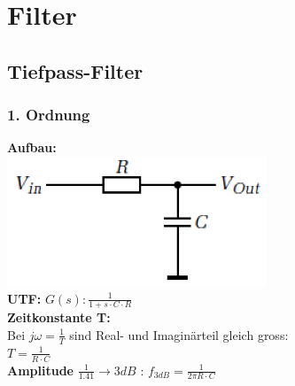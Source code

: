 \section{Filter}
\subsection{Tiefpass-Filter}

\subsubsection{1. Ordnung}
\begin{multicols}{2}
	\textbf{Aufbau:} \\
	\includegraphics[scale=0.4]{pictures/tiefpass1ordnung} \\
	\textbf{UTF: } $G(s): \frac{1}{1+s\cdot C\cdot R}$ \\
	\textbf{Zeitkonstante T:} \\
	Bei $j\omega=\frac{1}{T}$ sind Real-  und Imaginärteil gleich gross:  \\
	$T=\frac{1}{R \cdot C}$ \\
	\textbf{Amplitude} $\frac{1}{1.41}\to 3dB$ : $f_{3dB}=\frac{1}{2\pi R\cdot C}$ \\	
\end{multicols}



